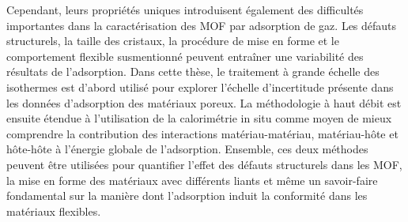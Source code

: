 Cependant, leurs propriétés uniques introduisent également des difficultés importantes dans la caractérisation des MOF par adsorption de gaz. Les défauts structurels, la taille des cristaux, la procédure de mise en forme et le comportement flexible susmentionné peuvent entraîner une variabilité des résultats de l'adsorption. Dans cette thèse, le traitement à grande échelle des isothermes est d'abord utilisé pour explorer l'échelle d'incertitude présente dans les données d'adsorption des matériaux poreux. La méthodologie à haut débit est ensuite étendue à l’utilisation de la calorimétrie in situ comme moyen de mieux comprendre la contribution des interactions matériau-matériau, matériau-hôte et hôte-hôte à l’énergie globale de l’adsorption. Ensemble, ces deux méthodes peuvent être utilisées pour quantifier l'effet des défauts structurels dans les MOF, la mise en forme des matériaux avec différents liants et même un savoir-faire fondamental sur la manière dont l'adsorption induit la conformité dans les matériaux flexibles.
